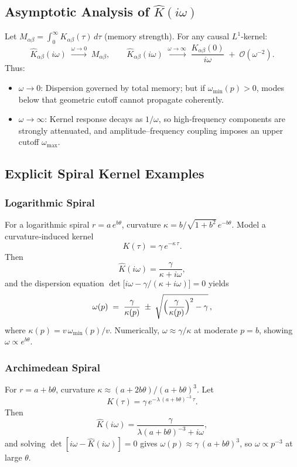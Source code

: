 \subsection{Asymptotic Analysis of \(\widehat K(i\omega)\)}

Let $M_{\alpha\beta}=\int_0^\infty K_{\alpha\beta}(\tau)\,d\tau$ (memory strength).  For any causal $L^1$‐kernel:
\[
\widehat K_{\alpha\beta}(i\omega)
\;\xrightarrow{\omega\to0}\;
M_{\alpha\beta},
\qquad
\widehat K_{\alpha\beta}(i\omega)
\;\xrightarrow{\omega\to\infty}\;
\frac{K_{\alpha\beta}(0)}{i\omega}
\;+\;\mathcal O(\omega^{-2}).
\]
Thus:
\begin{itemize}
  \item \(\omega\to0\): Dispersion governed by total memory; but if $\omega_{\min}(p)>0$, modes below that geometric cutoff cannot propagate coherently.
  \item \(\omega\to\infty\): Kernel response decays as $1/\omega$, so high‐frequency components are strongly attenuated, and amplitude–frequency coupling imposes an upper cutoff $\omega_{\max}$.
\end{itemize}

\subsection{Explicit Spiral Kernel Examples}

\subsubsection{Logarithmic Spiral}

For a logarithmic spiral $r=a\,e^{b\theta}$, curvature $\kappa=b/\sqrt{1+b^2}\,e^{-b\theta}$.  Model a curvature‐induced kernel
\[
K(\tau) = \gamma\,e^{-\kappa\,\tau}.
\]
Then
\[
\widehat K(i\omega)
= \frac{\gamma}{\kappa + i\omega},
\]
and the dispersion equation
\(\det\bigl[i\omega - \gamma/(\kappa+i\omega)\bigr]=0\)
yields
\[
\omega(p)
\;=\;
\frac{\gamma}{\kappa(p)} \;\pm\;\sqrt{\Bigl(\frac{\gamma}{\kappa(p)}\Bigr)^{2} - \gamma}\,,
\]
where $\kappa(p)=v\,\omega_{\min}(p)/v$.  Numerically, $\omega\approx\gamma/\kappa$ at moderate $p=b$, showing $\omega\propto e^{b\theta}$.

\subsubsection{Archimedean Spiral}

For $r=a+b\theta$, curvature $\kappa\approx(a+2b\theta)/(a+b\theta)^{3}$.  Let
\[
K(\tau)=\gamma\,e^{-\lambda\,(a+b\theta)^{-3}\,\tau}.
\]
Then
\[
\widehat K(i\omega)
= \frac{\gamma}{\lambda (a+b\theta)^{-3} + i\omega},
\]
and solving
\(\det[i\omega - \widehat K(i\omega)]=0\)
gives $\omega(p)\approx\gamma\, (a+b\theta)^{3}$, so $\omega\propto p^{-3}$ at large $\theta$.

